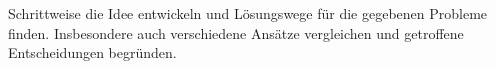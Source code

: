 Schrittweise die Idee entwickeln und L\"osungswege f\"ur die gegebenen Probleme finden. Insbesondere auch verschiedene Ans\"atze vergleichen und getroffene Entscheidungen begr\"unden.